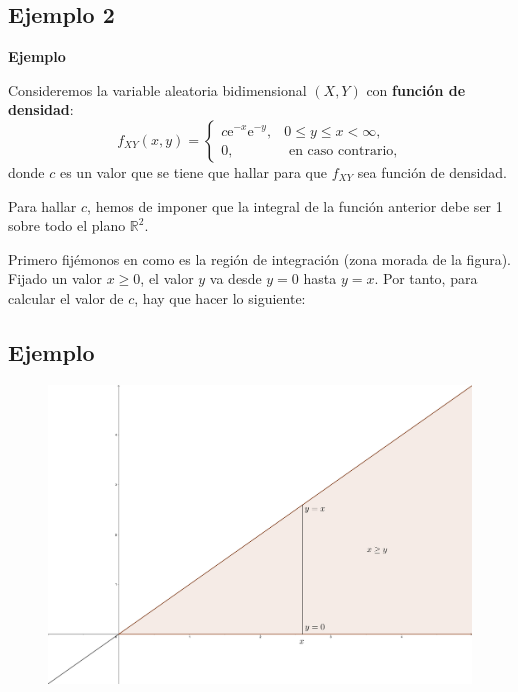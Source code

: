 \documentclass[]{book}
\begin{document}
\hypertarget{ejemplo-2-1}{%
\subsection{Ejemplo 2}\label{ejemplo-2-1}}

\textbf{Ejemplo}

Consideremos la variable aleatoria bidimensional \((X,Y)\) con \textbf{función de densidad}:
\[
f_{XY}(x,y)=\begin{cases}
c \mathrm{e}^{-x}\mathrm{e}^{-y}, & 0\leq y\leq x < \infty,\\
0, & \mbox{ en caso contrario,}
\end{cases}
\]
donde \(c\) es un valor que se tiene que hallar para que \(f_{XY}\) sea función de densidad.

Para hallar \(c\), hemos de imponer que la integral de la función anterior debe ser 1 sobre todo el plano \(\mathbb{R}^2\).

Primero fijémonos en como es la región de integración (zona morada de la figura). Fijado un valor \(x\geq 0\), el valor \(y\) va desde \(y=0\) hasta \(y=x\). Por tanto, para calcular el valor de \(c\), hay que hacer lo siguiente:

\hypertarget{ejemplo-51}{%
\subsection{Ejemplo}\label{ejemplo-51}}

\begin{figure}
\includegraphics[width=700px]{Images/Ejemplo2Bidi} \end{figure}
\end{document}
